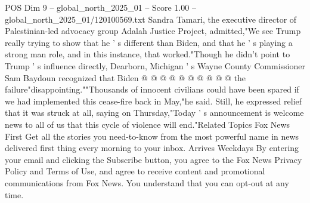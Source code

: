 \begin{textsample}{POS Dim 9 – global\_north\_2025\_01 – Score 1.00 – global\_north\_2025\_01/120100569.txt}
Sandra Tamari, the executive director of Palestinian-led advocacy group Adalah Justice Project, admitted,"We see Trump really trying to show that he ' s different than Biden, and that he ' s playing a strong man role, and in this instance, that worked."Though he didn't point to Trump ' s influence directly, Dearborn, Michigan ' s Wayne County Commissioner Sam Baydoun recognized that Biden @ @ @ @ @ @ @ @ @ @ the failure"disappointing.""Thousands of innocent civilians could have been spared if we had implemented this cease-fire back in May,"he said.
Still, he expressed relief that it was struck at all, saying on Thursday,"Today ' s announcement is welcome news to all of us that this cycle of violence will end."Related Topics Fox News First Get all the stories you need-to-know from the most powerful name in news delivered first thing every morning to your inbox.
Arrives Weekdays By entering your email and clicking the Subscribe button, you agree to the Fox News Privacy Policy and Terms of Use, and agree to receive content and promotional communications from Fox News.
You understand that you can opt-out at any time.

\end{textsample}

